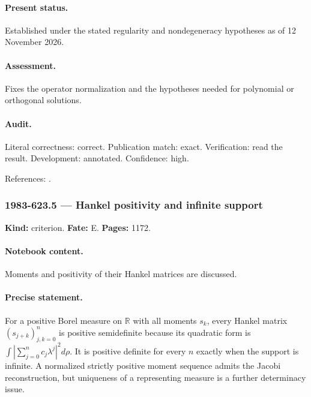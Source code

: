 \paragraph{Present status.} Established under the stated regularity and nondegeneracy hypotheses as of 12 November 2026.

\paragraph{Assessment.} Fixes the operator normalization and the hypotheses needed for polynomial or orthogonal solutions.

\paragraph{Audit.} Literal correctness: correct. Publication match: exact. Verification: read the result. Development: annotated. Confidence: high.

\noindent References: \citep{berezanskii1985integration}.\par

\subsubsection{1983-623.5 --- Hankel positivity and infinite support}

\label{item:1983-623.5}

\noindent\textbf{Kind:} criterion. \textbf{Fate:} E. \textbf{Pages:} 1172.\par

\paragraph{Notebook content.} Moments and positivity of their Hankel matrices are discussed.

\paragraph{Precise statement.} For a positive Borel measure on \(\mathbb R\) with all moments \(s_k\), every Hankel matrix \((s_{j+k})_{j,k=0}^n\) is positive semidefinite because its quadratic form is \(\int|\sum_{j=0}^nc_j\lambda^j|^2d\rho\). It is positive definite for every \(n\) exactly when the support is infinite. A normalized strictly positive moment sequence admits the Jacobi reconstruction, but uniqueness of a representing measure is a further determinacy issue.

